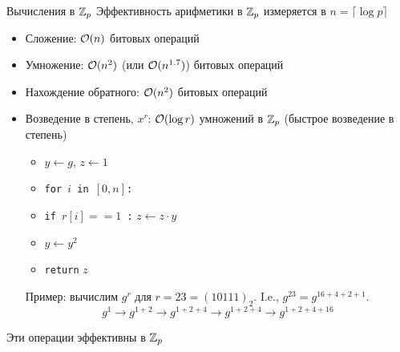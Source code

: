 \documentclass[usenames,dvipsnames,8pt,aspectratio=169]{beamer}
\begin{document}
\begin{frame}{Вычисления в ${{\mathbb Z}}_p$ }
	\large
	Эффективность арифметики в ${{\mathbb Z}}_p$ измеряется в $n = \lceil \log p \rceil$
	\begin{itemize}
		\itemsep 5pt
		\item Сложение: $\mathcal{O}(n)$ битовых операций
		\item Умножение: $\mathcal{O}(n^2)$ (или $\mathcal{O}(n^{1.7})$) битовых операций
		\item Нахождение обратного: $\mathcal{O}(n^2)$ битовых операций
		\pause
		\item Возведение в степень, $x^r$:  $\mathcal{O}(\log r)$ умножений в ${{\mathbb Z}}_p$ (быстрое возведение в степень)\\
		\begin{itemize}
			\Large
			\item $y \leftarrow g$, $z \leftarrow 1$
			\item \texttt{for $i$ in $[0, n]$:}
			\item \hspace{10pt}  \texttt{if $r[i]==1$ :} $z \leftarrow z \cdot y$
			\item \hspace{10pt}  $y \leftarrow y^2$
			\item \texttt{return} $z$
		\end{itemize}
		\pause 
		Пример: вычислим $g^r$ для $r = 23 = (10111)_2$. I.e., $g^{23} = g^{16+4+2+1}$. \\
		\[
			g^1 \rightarrow g^{1+2} \rightarrow g^{1+2+4} \rightarrow  g^{1+2+4} \rightarrow g^{1+2+4+16} 
		\]
	
	\end{itemize}

\vspace{15pt}
\centering
\Large
Эти операции {\color{Orange} {эффективны}} в ${{\mathbb Z}}_p$
\end{frame}
\end{document}
